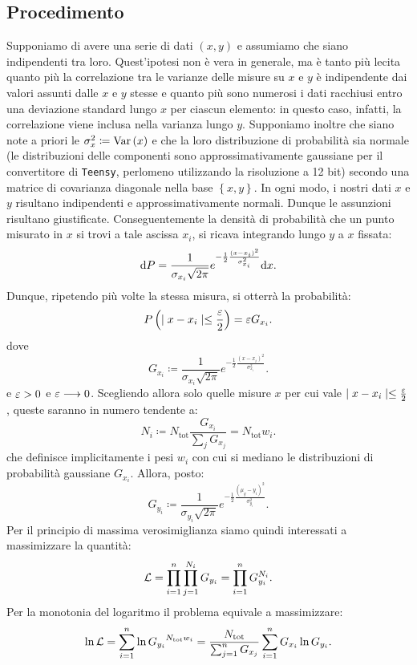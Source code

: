 \documentclass{article}[a4paper, oneside, 11pt]
\begin{document}
\subsection{Procedimento}
Supponiamo di avere una serie di dati $(x, y)$ e assumiamo che siano
indipendenti tra loro. Quest'ipotesi non \`e vera in generale, ma
\`e tanto pi\`u lecita quanto pi\`u la correlazione tra le varianze delle
misure su $x$ e $y$ \`e indipendente dai valori assunti dalle $x$ e $y$ stesse
e quanto pi\`u sono numerosi i dati racchiusi entro una deviazione standard
lungo $x$ per ciascun elemento: in questo caso, infatti, la correlazione
viene inclusa nella varianza lungo $y$.
Supponiamo inoltre che siano note a priori le $\sigma_x ^2 \coloneqq \text{Var}\left(x\right)$
e che la loro distribuzione di probabilit\`a sia normale (le distribuzioni
delle componenti sono approssimativamente gaussiane per il convertitore
di \verb+Teensy+, perlomeno utilizzando la risoluzione a 12 bit) secondo una 
matrice
di covarianza diagonale nella base $\left\{x, y\right\}$.
In ogni modo, i nostri dati $x$ e $y$ risultano indipendenti e
approssimativamente normali. Dunque le assunzioni risultano giustificate. 
Conseguentemente la densit\`a di probabilit\`a che un punto misurato in $x$ si trovi
a tale ascissa $x_i$, si ricava integrando lungo $y$ a $x$ fissata:
\[
	\mathrm{d} P = \frac{1}{\sigma_{x_i} \sqrt{2\pi}}
	e^{-\frac{1}{2}{\frac{(x - x_i)^2}{\sigma_{x_i}^2}}} \mathrm{d} x
.\] 
Dunque, ripetendo pi\`u volte la stessa misura, si otterr\`a la probabilit\`a:
\[
	P\left(\mid x - x_i \mid \leq \frac{\varepsilon}{2} \right) = \varepsilon G_{x_i} 
.\]
dove \[
	G_{x_i} \coloneqq \frac{1}{\sigma_{x_i} \sqrt{2\pi}}
	e^{-\frac{1}{2}{\frac{(x - x_i)^2}{\sigma_{x_i}^2}}}
.\] 
e $\varepsilon > 0$ e $\varepsilon \longrightarrow 0$. Scegliendo allora solo quelle misure $x$ per
cui vale $\mid x - x_i \mid \leq \frac{\varepsilon}{2}$, queste saranno in numero
tendente a:
\[
	N_i \coloneqq N_{\text{tot}} \frac{G_{x_i}}{\sum_j G_{x_j}} =
		N_{\text{tot}} w_i
.\] 
che definisce implicitamente i pesi $w_i$ con cui si mediano le distribuzioni
di probabilit\`a gaussiane $G_{x_i}$.
Allora, posto:
\[
	G_{y_i} \coloneqq \frac{1}{\sigma_{y_i} \sqrt{2\pi}}
	e^{-\frac{1}{2}{\frac{(\mu_y - y_i)^2}{\sigma_{y_i}^2}}}
.\] 
Per il principio di massima verosimiglianza siamo quindi interessati a
massimizzare la quantit\`a:
\[
	\mathcal L = \prod_{i=1}^{n} \prod_{j=1}^{N_i} G_{y_i} = 
	\prod_{i=1}^{n} G_{y_i}^{N_i}
.\] 
Per la monotonia del logaritmo il problema equivale a massimizzare: 
\[
	\ln{\mathcal L} = \sum_{i=1}^{n}\ln{G_{y_i}}^{N_{\text{tot}}w_i} = 
	\frac{N_{\text{tot}}} {\sum_{j=1}^{n} G_{x_j}} 
	\sum_{i=1}^{n} G_{x_i} \ln{G_{y_i}}
.\] 
\end{document}
